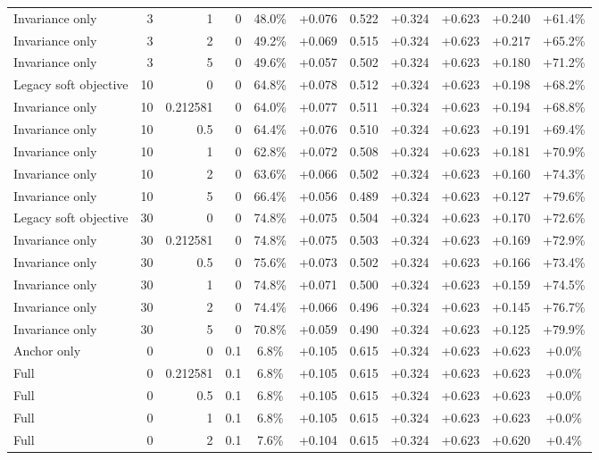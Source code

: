 \begin{table}[htbp]
\begin{tabular}{lrrrccccccc}
Invariance only & 3 & 1 & 0 & 48.0\% & +0.076 & 0.522 & +0.324 & +0.623 & +0.240 & +61.4\% \\
Invariance only & 3 & 2 & 0 & 49.2\% & +0.069 & 0.515 & +0.324 & +0.623 & +0.217 & +65.2\% \\
Invariance only & 3 & 5 & 0 & 49.6\% & +0.057 & 0.502 & +0.324 & +0.623 & +0.180 & +71.2\% \\
Legacy soft objective & 10 & 0 & 0 & 64.8\% & +0.078 & 0.512 & +0.324 & +0.623 & +0.198 & +68.2\% \\
Invariance only & 10 & 0.212581 & 0 & 64.0\% & +0.077 & 0.511 & +0.324 & +0.623 & +0.194 & +68.8\% \\
Invariance only & 10 & 0.5 & 0 & 64.4\% & +0.076 & 0.510 & +0.324 & +0.623 & +0.191 & +69.4\% \\
Invariance only & 10 & 1 & 0 & 62.8\% & +0.072 & 0.508 & +0.324 & +0.623 & +0.181 & +70.9\% \\
Invariance only & 10 & 2 & 0 & 63.6\% & +0.066 & 0.502 & +0.324 & +0.623 & +0.160 & +74.3\% \\
Invariance only & 10 & 5 & 0 & 66.4\% & +0.056 & 0.489 & +0.324 & +0.623 & +0.127 & +79.6\% \\
Legacy soft objective & 30 & 0 & 0 & 74.8\% & +0.075 & 0.504 & +0.324 & +0.623 & +0.170 & +72.6\% \\
Invariance only & 30 & 0.212581 & 0 & 74.8\% & +0.075 & 0.503 & +0.324 & +0.623 & +0.169 & +72.9\% \\
Invariance only & 30 & 0.5 & 0 & 75.6\% & +0.073 & 0.502 & +0.324 & +0.623 & +0.166 & +73.4\% \\
Invariance only & 30 & 1 & 0 & 74.8\% & +0.071 & 0.500 & +0.324 & +0.623 & +0.159 & +74.5\% \\
Invariance only & 30 & 2 & 0 & 74.4\% & +0.066 & 0.496 & +0.324 & +0.623 & +0.145 & +76.7\% \\
Invariance only & 30 & 5 & 0 & 70.8\% & +0.059 & 0.490 & +0.324 & +0.623 & +0.125 & +79.9\% \\
Anchor only & 0 & 0 & 0.1 & 6.8\% & +0.105 & 0.615 & +0.324 & +0.623 & +0.623 & +0.0\% \\
Full & 0 & 0.212581 & 0.1 & 6.8\% & +0.105 & 0.615 & +0.324 & +0.623 & +0.623 & +0.0\% \\
Full & 0 & 0.5 & 0.1 & 6.8\% & +0.105 & 0.615 & +0.324 & +0.623 & +0.623 & +0.0\% \\
Full & 0 & 1 & 0.1 & 6.8\% & +0.105 & 0.615 & +0.324 & +0.623 & +0.623 & +0.0\% \\
Full & 0 & 2 & 0.1 & 7.6\% & +0.104 & 0.615 & +0.324 & +0.623 & +0.620 & +0.4\% \\

\end{tabular}
\end{table}
